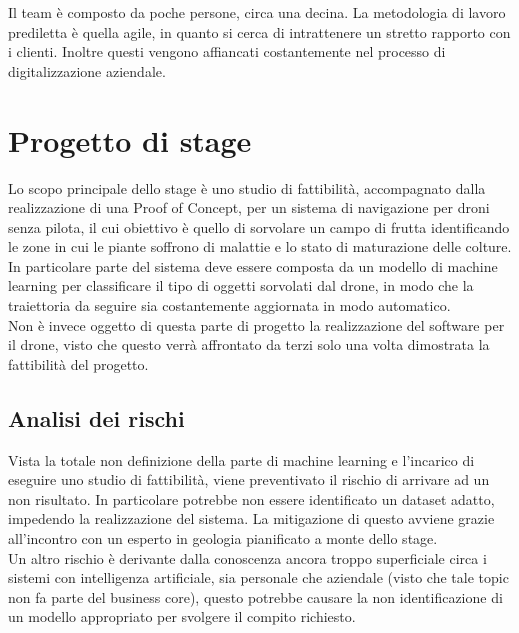 Il team è composto da poche persone, circa una decina. La metodologia di lavoro prediletta è quella agile, in quanto si cerca di intrattenere un stretto rapporto con i clienti. Inoltre questi vengono affiancati costantemente nel processo di digitalizzazione aziendale.

\section{Progetto di stage}

Lo scopo principale dello stage è uno studio di fattibilità, accompagnato dalla realizzazione di una Proof of Concept, per un sistema di navigazione
per droni senza pilota, il cui obiettivo è quello di sorvolare un campo di frutta identificando le zone in cui le piante soffrono di malattie e lo stato
di maturazione delle colture.\\
In particolare parte del sistema deve essere composta da un modello di machine learning per classificare il tipo di oggetti sorvolati dal drone,
in modo che la traiettoria da seguire sia costantemente aggiornata in modo automatico.\\
Non è invece oggetto di questa parte di progetto la realizzazione del software per il drone, visto che questo verrà affrontato da terzi solo una volta dimostrata
la fattibilità del progetto.

\subsection{Analisi dei rischi}
Vista la totale non definizione della parte di machine learning e l'incarico di eseguire uno studio di fattibilità, viene preventivato il rischio di arrivare ad un non risultato.
In particolare potrebbe non essere identificato un dataset adatto, impedendo la realizzazione del sistema. La mitigazione di questo avviene grazie
all'incontro con un esperto in geologia pianificato a monte dello stage.\\
Un altro rischio è derivante dalla conoscenza ancora troppo superficiale circa i sistemi con intelligenza artificiale, sia personale che aziendale (visto che tale
topic non fa parte del business core), questo potrebbe causare la non identificazione di un modello appropriato per svolgere il compito richiesto.

